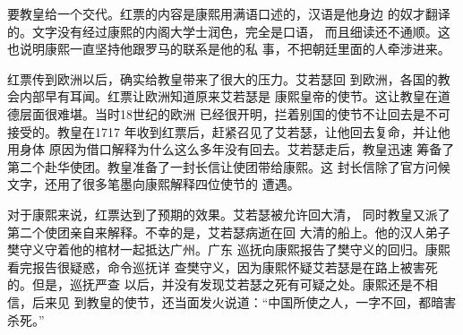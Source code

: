 要教皇给一个交代。红票的内容是康熙用满语口述的，汉语是他身边%
的奴才翻译的。文字没有经过康熙的内阁大学士润色，完全是口语，%
而且细读还不通顺。这也说明康熙一直坚持他跟罗马的联系是他的私%
事，不把朝廷里面的人牵涉进来。%
\par
红票传到欧洲以后，确实给教皇带来了很大的压力。艾若瑟回%
到欧洲，各国的教会内部早有耳闻。红票让欧洲知道原来艾若瑟是%
康熙皇帝的使节。这让教皇在道德层面很难堪。当时18世纪的欧洲%
已经很开明，拦着别国的使节不让回去是不可接受的。教皇在1717%
年收到红票后，赶紧召见了艾若瑟，让他回去复命，并让他用身体%
原因为借口解释为什么这么多年没有回去。艾若瑟走后，教皇迅速%
筹备了第二个赴华使团。教皇准备了一封长信让使团带给康熙。这%
封长信除了官方问候文字，还用了很多笔墨向康熙解释四位使节的%
遭遇。%
\par
对于康熙来说，红票达到了预期的效果。艾若瑟被允许回大清，%
同时教皇又派了第二个使团亲自来解释。不幸的是，艾若瑟病逝在回%
大清的船上。他的汉人弟子樊守义守着他的棺材一起抵达广州。广东%
巡抚向康熙报告了樊守义的回归。康熙看完报告很疑惑，命令巡抚详%
查樊守义，因为康熙怀疑艾若瑟是在路上被害死的。但是，巡抚严查%
以后，并没有发现艾若瑟之死有可疑之处。康熙还是不相信，后来见%
到教皇的使节，还当面发火说道：“中国所使之人，一字不回，都暗害%
杀死。”%
